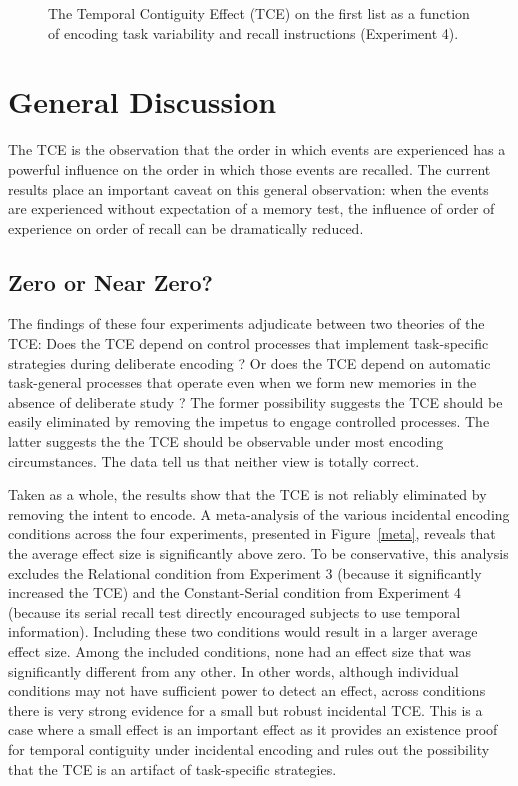 \documentclass[man,natbib,floatsintext]{apa6} %
\begin{document}
\begin{figure}%
\caption{The Temporal Contiguity Effect (TCE) on the first list as a function of encoding task variability and recall instructions (Experiment 4).\paneltext}
\label{e4_l1_crp}
\end{figure}

\section{General Discussion}
The TCE is the observation that the order in which events are experienced has a powerful influence on the order in which those events are recalled. The current results place an important caveat on this general observation: when the events are experienced without expectation of a memory test, the influence of order of experience on order of recall can be dramatically reduced.  

\subsection{Zero or Near Zero?}
The findings of these four experiments adjudicate between two theories of the TCE: Does the TCE depend on control processes that implement task-specific strategies during deliberate encoding \citep{Hint16}? Or does the TCE depend on automatic task-general processes that operate even when we form new memories in the absence of deliberate study \citep{HealKaha17}? The former possibility suggests the TCE should be easily eliminated by removing the impetus to engage controlled processes. The latter suggests the the TCE should be observable under most encoding circumstances. The data tell us that neither view is totally correct.

Taken as a whole, the results show that the TCE is not reliably eliminated by removing the intent to encode. A meta-analysis of the various incidental encoding conditions across the four experiments, presented in Figure~\ref{meta}, reveals that the average effect size is significantly above zero. To be conservative, this analysis excludes the Relational condition from Experiment 3 (because it significantly increased the TCE) and the Constant-Serial condition from Experiment 4 (because its serial recall test directly encouraged subjects to use temporal information). Including these two conditions would result in a larger average effect size. Among the included conditions, none had an effect size that was significantly different from any other. In other words, although individual conditions may not have sufficient power to detect an effect, across conditions there is very strong evidence for a small but robust incidental TCE. This is a case where a small effect is an important effect as it provides an existence proof for temporal contiguity under incidental encoding and rules out the possibility that the TCE is an artifact of task-specific strategies.
\end{document}
